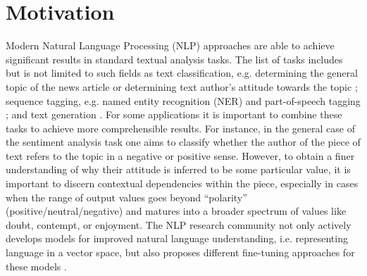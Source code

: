 
\section{Motivation}\label{sec:motication}

Modern Natural Language Processing (NLP) approaches are able to achieve significant results in standard textual analysis tasks. 
The list of tasks includes but is not limited to such fields as text classification, e.g. determining the general topic of the news article \cite{text-classification-Altinel2018} or determining text author's attitude towards the topic \cite{sentiment-analysis-Medhat2014}; sequence tagging,  e.g. named entity recognition (NER)  \cite{ner-Strakova2019,ner-Zhanming2019,ner-Yamada2020,ner-Luoma2020} and part-of-speech tagging \cite{pos-tagging-Bohnet2018}; and text generation \cite{text-gen-Guo2017}. For some applications it is important to combine these tasks to achieve more comprehensible results. 
For instance, in the general case of the sentiment analysis task one aims to classify  whether the author of the piece of text refers to the topic in a negative or positive sense. However, to obtain a finer understanding of why their attitude is inferred to be some particular value, it is important to discern contextual dependencies within the piece, especially in cases when the range of output values goes beyond “polarity” (positive/neutral/negative) and matures into a broader spectrum of values like doubt, contempt, or enjoyment. 
The NLP research community not only actively develops models for improved natural language understanding, i.e. representing language in a vector space, \cite{gpt-Radford2018,bert-Devlin2019,xlnet-Yang2020} but also proposes different fine-tuning approaches for these models \cite{robarta-Liu2019,spanbert-Joshi2020,gpt2-Radford2019,gpt3-Brown2020}. 

